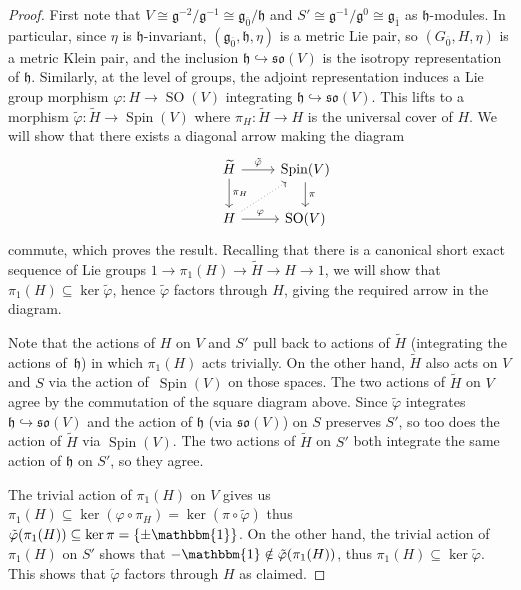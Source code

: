 \documentclass[10pt,a4paper]{amsart}
\numberwithin{equation}{section}
\newcommand{\fg}{\mathfrak{g}}
\newcommand{\fh}{\mathfrak{h}}
\newcommand{\fso}{\mathfrak{so}}
\newcommand{\Htilde}{\widetilde{H}}
\newcommand{\1}{\mathbbm{1}}
\DeclareMathOperator{\Spin}{Spin}
\DeclareMathOperator{\SO}{SO}
\begin{document}
\begin{proof}
	First note that $V\cong \fg^{-2}/\fg^{-1} \cong \fg_{\overline0}/\fh$ and $S'\cong\fg^{-1}/\fg^0\cong\fg_{\overline1}$ as $\fh$-modules. In particular, since $\eta$ is $\fh$-invariant, $(\fg_{\overline0},\fh,\eta)$ is a metric Lie pair, so $(G_{\overline0},H,\eta)$ is a metric Klein pair, and the inclusion $\fh\hookrightarrow\fso(V)$ is the isotropy representation of $\fh$. Similarly, at the level of groups, the adjoint representation induces a Lie group morphism $\varphi\colon H\to\SO(V)$ integrating $\fh\hookrightarrow\fso(V)$. This lifts to a morphism $\tilde\varphi\colon\Htilde \to \Spin(V)$ where $\pi_H\colon\Htilde\to H$ is the universal cover of $H$. We will show that there exists a diagonal arrow making the diagram
		\[
		\begin{tikzcd}
			& \Htilde \ar[d,"\pi_H"]\ar[r,"\tilde\varphi"]	& \Spin(V) \ar[d,"\pi"]	\\
			& H \ar[r,"\varphi"]\ar[ur,dotted]	& \SO(V)
		\end{tikzcd}
		\]
	commute, which proves the result. Recalling that there is a canonical short exact sequence of Lie groups
$ 1 \longrightarrow \pi_1(H) \longrightarrow\Htilde \longrightarrow H \longrightarrow1$,
	we will show that $\pi_1(H)\subseteq\ker\tilde\varphi$, hence $\tilde\varphi$ factors through $H$, giving the required arrow in the diagram.
	
	Note that the actions of $H$ on $V$ and $S'$ pull back to actions of $\Htilde$ (integrating the actions of~$\fh$) in which $\pi_1(H)$ acts trivially. On the other hand, $\Htilde$ also acts on $V$ and $S$ via the action of~$\Spin(V)$ on those spaces. The two actions of $\Htilde$ on $V$ agree by the commutation of the square diagram above. Since $\tilde\varphi$ integrates $\fh\hookrightarrow \fso(V)$ and the action of $\fh$ (via $\fso(V)$) on $S$ preserves $S'$, so too does the action of $\Htilde$ via $\Spin(V)$. The two actions of $\Htilde$ on $S'$ both integrate the same action of $\fh$ on $S'$, so they agree.
		
	The trivial action of $\pi_1(H)$ on $V$ gives us
$\pi_1(H)\subseteq\ker(\varphi\circ\pi_H)=\ker(\pi\circ\tilde\varphi)
$
	thus $\tilde\varphi(\pi_1(H))\subseteq\ker\pi=\{\pm\1\}$. On the other hand, the trivial action of $\pi_1(H)$ on $S'$ shows that $-\1\notin\tilde\varphi(\pi_1(H))$, thus $\pi_1(H)\subseteq\ker\tilde\varphi$. This shows that $\tilde\varphi$ factors through $H$ as claimed.
\end{proof}
\end{document}
